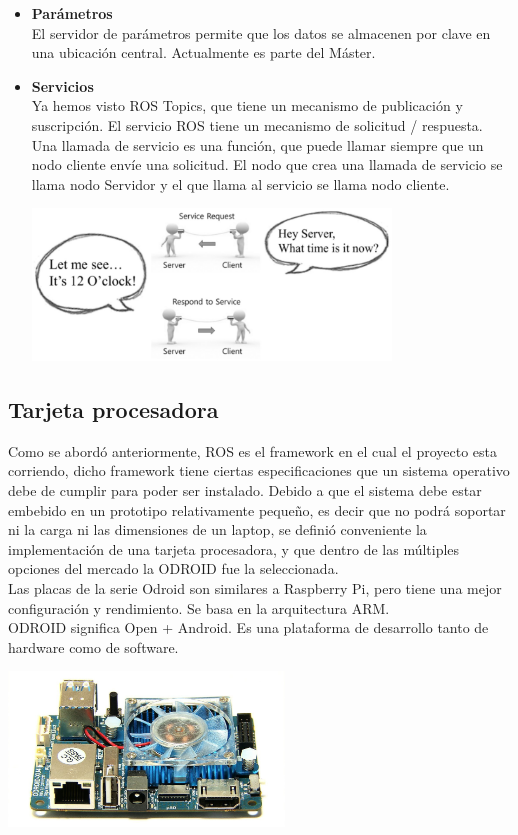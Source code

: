 \begin{itemize}
    \item \textbf{Parámetros}\\
    El servidor de parámetros permite que los datos se almacenen por clave en una
    ubicación central. Actualmente es parte del Máster.
    \item \textbf{Servicios}\\
    Ya hemos visto ROS Topics, que tiene un mecanismo de publicación y suscripción.
    El servicio ROS tiene un mecanismo de solicitud / respuesta. Una llamada de
    servicio es una función, que puede llamar siempre que un nodo cliente envíe una
    solicitud. El nodo que crea una llamada de servicio se llama nodo Servidor y el
    que llama al servicio se llama nodo cliente.~\cite{ROSLENTIN}
    \begin{center}
        \includegraphics[width=0.75\textwidth]{Capitulo2/Fig4.eps}
        \label{Fig4}
    \end{center}

\end{itemize}
\subsection{Tarjeta procesadora}
Como se abordó anteriormente, ROS es el framework en el cual el proyecto esta corriendo,
dicho framework tiene ciertas especificaciones que un sistema operativo debe de cumplir
para poder ser instalado. Debido a que el sistema debe estar embebido en un prototipo
relativamente pequeño, es decir que no podrá soportar ni la carga ni las dimensiones
de un laptop, se definió conveniente la implementación de una tarjeta procesadora, y que
dentro de las múltiples opciones del mercado la ODROID fue la seleccionada.\\
Las placas de la serie Odroid son similares a Raspberry Pi, pero tiene una mejor
configuración y rendimiento. Se basa en la arquitectura ARM.~\cite{ROSLENTIN}\\
ODROID significa Open + Android. Es una plataforma de desarrollo tanto de
hardware como de software.
\begin{center}
    \includegraphics[width=0.55\textwidth]{Capitulo2/Fig5.eps}
    \label{Fig5}
\end{center}

